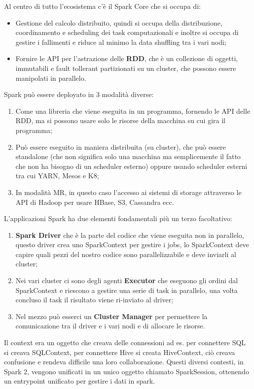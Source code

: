 \documentclass[11pt, twocolumn]{article}
\newenvironment{myitemize}
{ \begin{itemize}[topsep=0ex]
		\setlength{\itemsep}{0pt}
		\setlength{\parskip}{0pt}
		\setlength{\parsep}{0pt}     }
	{ \end{itemize}                  }
\newenvironment{myenumerate}
{ \begin{enumerate}[topsep=0ex]
		\setlength{\itemsep}{0pt}
		\setlength{\parskip}{0pt}
		\setlength{\parsep}{0pt}     }
	{ \end{enumerate}                  }
\begin{document}
Al centro di tutto l'ecosistema c'è il Spark Core che si occupa di:
\begin{myitemize}
	\item Gestione del calcolo distribuito, quindi si occupa della distribuzione, coordinamento e scheduling dei task computazionali e inoltre si occupa di gestire i fallimenti e riduce al minimo la data shuffling tra i vari nodi;
	\item Fornire le API per l'astrazione delle \textbf{RDD}, che è un collezione di oggetti, immutabili e fault tollerant partizionati su un cluster, che possono essere manipolati in parallelo.
\end{myitemize}
Spark può essere deployato in 3 modalità diverse:
\begin{myenumerate}
	\item Come una libreria che viene eseguita in un programma, fornendo le API delle RDD, ma si possono usare solo le risorse della macchina su cui gira il programma;
	\item Può essere eseguito in maniera distribuita (su cluster), che può essere standalone (che non significa solo una macchina ma semplicemente il fatto che non ha bisogno di un scheduler esterno) oppure usando scheduler esterni tra cui YARN, Mesos e K8;
	\item In modalità MR, in questo caso l'accesso ai sistemi di storage attraverso le API di Hadoop per usare HBase, S3, Cassandra ecc.
\end{myenumerate}
L'applicazioni Spark ha due elementi fondamentali più un terzo facoltativo:
\begin{myenumerate}
	\item \textbf{Spark Driver} che è la parte del codice che viene eseguita non in parallelo, questo driver crea uno SparkContext per gestire i jobs, lo SparkContext deve capire quali pezzi del nostro codice sono parallelizzabile e deve inviarli al cluster;
	\item Nei vari cluster ci sono degli agenti \textbf{Executor} che eseguono gli ordini dal SparkContext e riescono a gestire una serie di task in parallelo, una volta concluso il task il risultato viene ri-inviato al driver;
	\item Nel mezzo può esserci un \textbf{Cluster Manager} per permettere la comunicazione tra il driver e i vari nodi e di allocare le risorse.
\end{myenumerate}
Il context era un oggetto che creava delle connessioni ad es. per connettere SQL si creava SQLContext, per connettere Hive si creata HiveContext, ciò creava confusione e rendeva difficile una loro collaborazione. 
Questi diversi contesti, in Spark 2, vengono unificati in un unico oggetto chiamato SparkSession, ottenendo un entrypoint unificato per gestire i dati in spark.
\end{document}
